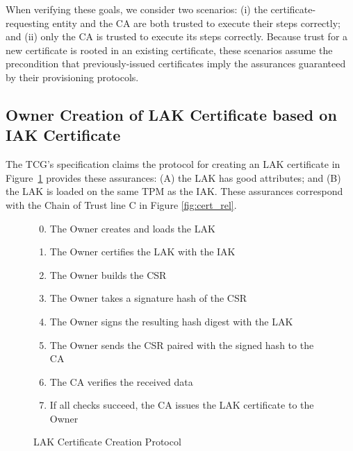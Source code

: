 \documentclass[runningheads]{llncs}
\begin{document}
When verifying these goals, we consider two scenarios: (i) the
certificate-requesting entity and the CA are both trusted to execute
their steps correctly; and (ii) only the CA is trusted to execute its
steps correctly.  Because trust for a new certificate is rooted in an
existing certificate, these scenarios assume the precondition that
previously-issued certificates imply the assurances guaranteed by
their provisioning protocols.

\subsection{Owner Creation of LAK Certificate based on IAK Certificate}

The TCG's specification claims the protocol for creating an LAK
certificate in Figure~\ref{fig:lak-certificate-creation} provides
these assurances: (A) the LAK has good attributes; and (B) the LAK is
loaded on the same TPM as the IAK. These assurances correspond with
the Chain of Trust line C in Figure \ref{fig:cert_rel}.

\begin{figure}[hpbt]
\begin{enumerate}[itemsep=0pt,parsep=0pt,partopsep=0pt]
  \setcounter{enumi}{-1}
  \item The Owner creates and loads the LAK
  \item The Owner certifies the LAK with the IAK
  \item The Owner builds the CSR%
  \item The Owner takes a signature hash of the CSR
  \item The Owner signs the resulting hash digest with the LAK
  \item The Owner sends the CSR paired with the signed hash to the CA
  \item The CA verifies the received data%
  \item If all checks succeed, the CA issues the LAK certificate to the Owner
  \end{enumerate}
  \caption{LAK Certificate Creation Protocol}
  \label{fig:lak-certificate-creation}
\end{figure}
\end{document}

